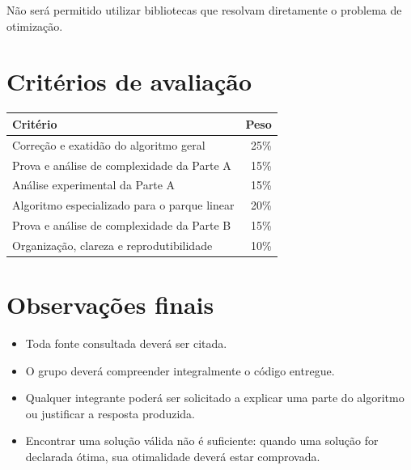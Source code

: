 \documentclass[11pt,a4paper]{article}
\begin{document}
Não será permitido utilizar bibliotecas que resolvam diretamente o problema de otimização.

\section{Critérios de avaliação}

\begin{center}
\begin{tabular}{>{\raggedright\arraybackslash}p{10cm}r}
\toprule
\textbf{Critério} & \textbf{Peso} \\
\midrule
Correção e exatidão do algoritmo geral & 25\% \\
Prova e análise de complexidade da Parte A & 15\% \\
Análise experimental da Parte A & 15\% \\
Algoritmo especializado para o parque linear & 20\% \\
Prova e análise de complexidade da Parte B & 15\% \\
Organização, clareza e reprodutibilidade & 10\% \\
\bottomrule
\end{tabular}
\end{center}

\section{Observações finais}

\begin{itemize}
    \item Toda fonte consultada deverá ser citada.
    \item O grupo deverá compreender integralmente o código entregue.
    \item Qualquer integrante poderá ser solicitado a explicar uma parte do algoritmo ou justificar a resposta produzida.
    \item Encontrar uma solução válida não é suficiente: quando uma solução for declarada ótima, sua otimalidade deverá estar comprovada.
\end{itemize}
\end{document}
